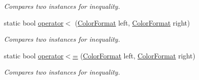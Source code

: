 \begin{DoxyCompactItemize}
\begin{DoxyCompactList}\small\item\em Compares two instances for inequality. \end{DoxyCompactList}\item 
static bool \hyperlink{struct_open_t_k_1_1_graphics_1_1_color_format_a76aeca2091f48a550da58a9e96e0301e}{operator$<$} (\hyperlink{struct_open_t_k_1_1_graphics_1_1_color_format}{Color\-Format} left, \hyperlink{struct_open_t_k_1_1_graphics_1_1_color_format}{Color\-Format} right)
\begin{DoxyCompactList}\small\item\em Compares two instances for inequality. \end{DoxyCompactList}\item 
static bool \hyperlink{struct_open_t_k_1_1_graphics_1_1_color_format_aa169062442d92305de0f6c453232049e}{operator$<$=} (\hyperlink{struct_open_t_k_1_1_graphics_1_1_color_format}{Color\-Format} left, \hyperlink{struct_open_t_k_1_1_graphics_1_1_color_format}{Color\-Format} right)
\begin{DoxyCompactList}\small\item\em Compares two instances for inequality. \end{DoxyCompactList}\end{DoxyCompactItemize}
